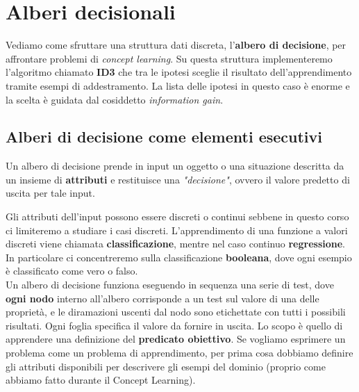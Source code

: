 \section{Alberi decisionali}
Vediamo come sfruttare una struttura dati discreta, l'\textbf{albero di
  decisione}, per affrontare problemi di \textit{concept learning}. Su questa
struttura implementeremo l'algoritmo chiamato \textbf{ID3} che tra le ipotesi
sceglie il risultato dell'apprendimento tramite esempi di addestramento. La
lista delle ipotesi in questo caso è enorme e la scelta è guidata dal cosiddetto
\textit{information gain}.
\subsection{Alberi di decisione come elementi esecutivi}
\begin{definizione}
Un albero di decisione prende in input un oggetto o una situazione descritta da un insieme di \textbf{attributi} e restituisce una \textit{"decisione"}, ovvero il valore predetto di uscita per tale input.
\end{definizione}
Gli attributi dell'input possono essere discreti o continui sebbene in questo corso ci limiteremo a studiare i casi discreti. L'apprendimento di una funzione a valori discreti viene chiamata \textbf{classificazione}, mentre nel caso continuo \textbf{regressione}. In particolare ci concentreremo sulla classificazione \textbf{booleana}, dove ogni esempio è classificato come vero o falso.\\  Un albero di decisione funziona eseguendo in sequenza una serie di test, dove \textbf{ogni nodo} interno all'albero corrisponde a un test sul valore di una delle proprietà, e le diramazioni uscenti dal nodo sono etichettate con tutti i possibili risultati. Ogni foglia specifica il valore da fornire in uscita. Lo scopo è quello di apprendere una definizione del \textbf{predicato obiettivo}. Se vogliamo esprimere un problema come un problema di apprendimento, per prima cosa dobbiamo definire gli attributi disponibili per descrivere gli esempi del dominio (proprio come abbiamo fatto durante il Concept Learning).
